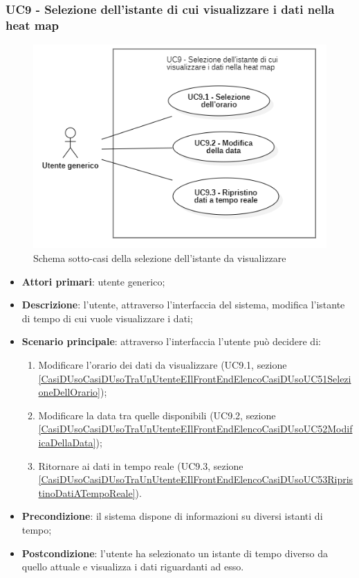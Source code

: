 \subsubsection{UC9 - Selezione dell’istante di cui visualizzare i dati nella heat map
}\label{CasiDUsoCasiDUsoTraUnUtenteEIlFrontEndElencoCasiDUsoUC5SelezioneDellIstanzeDiCuiVisualizzareIDatiNellaHeatmap}%
\begin{center}
	\begin{figure}[H]
		\centering\includegraphics[scale=0.7]{../immagini/attori_casi/UC_9_1_2_3.png}
		\caption{Schema sotto-casi della selezione dell'istante da visualizzare}
	\end{figure}
\end{center}
\begin{itemize}
	\item \textbf{Attori primari}: utente generico;
	\item \textbf{Descrizione}: l’utente, attraverso l’interfaccia del sistema, modifica l’istante di tempo di cui vuole visualizzare i dati;
	\item \textbf{Scenario principale}: attraverso l’interfaccia l’utente può decidere di:
		\begin{enumerate}
			\item Modificare l’orario dei dati da visualizzare (UC9.1, sezione  \ref{CasiDUsoCasiDUsoTraUnUtenteEIlFrontEndElencoCasiDUsoUC51SelezioneDellOrario});
			\item Modificare la data tra quelle disponibili (UC9.2, sezione \ref{CasiDUsoCasiDUsoTraUnUtenteEIlFrontEndElencoCasiDUsoUC52ModificaDellaData});
			\item Ritornare ai dati in tempo reale (UC9.3, sezione \ref{CasiDUsoCasiDUsoTraUnUtenteEIlFrontEndElencoCasiDUsoUC53RipristinoDatiATempoReale}).
		\end{enumerate}
	\item \textbf{Precondizione}: il sistema dispone di informazioni su diversi istanti di tempo;
	\item \textbf{Postcondizione}: l’utente ha selezionato un istante di tempo diverso da quello attuale e visualizza i dati riguardanti ad esso.%
\end{itemize}

